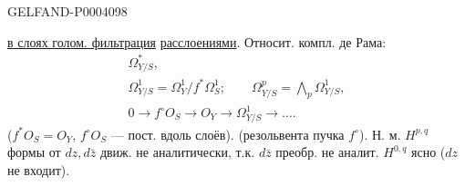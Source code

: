 \begin{GelfandAdjacentEvidence}{GELFAND-P000409}{8}


\underline{в слоях голом. фильтрация} \underline{расслоениями}.
Относит. компл. де Рама:
\begingroup\color{black}\begin{gather*}
\Omega^*_{Y/S},\\
\Omega^1_{Y/S}=\Omega^1_Y/f^*\Omega^1_S;\qquad\Omega^p_{Y/S}=\bigwedge_p\Omega^1_{Y/S},\\
0\longrightarrow f^\circ O_S\longrightarrow O_Y\longrightarrow\Omega^1_{Y/S}\longrightarrow\dots.
\end{gather*}\endgroup
($f^*O_S=O_Y$, $f^\circ O_S$ — пост. вдоль слоёв).
(резольвента пучка $f^\circ$).
Н. м. $H^{p,q}$ формы от $dz,d\bar z$ движ. не аналитически, т.к. $d\bar z$ преобр. не аналит.
$H^{0,q}$ ясно ($dz$ не входит).
\end{GelfandAdjacentEvidence}



